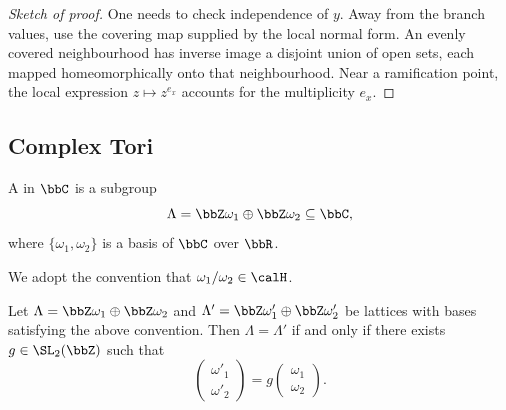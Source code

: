 \begin{proof}[Sketch of proof]
    One needs to check independence of $y$. Away from the branch values, use the covering map supplied by the local normal form. An evenly covered neighbourhood has inverse image a disjoint union of open sets, each mapped homeomorphically onto that neighbourhood. Near a ramification point, the local expression $z \mapsto z^{e_x}$ accounts for the multiplicity $e_x$.
\end{proof}

\subsection{Complex Tori}\label{Sec:MF_complex_tori}
\begin{definition}\label{Def:MF_lattice}
    A  in $\bbC$ is a subgroup
    \[
        \Lambda = \bbZ\omega_1 \oplus \bbZ\omega_2 \subseteq \bbC,
    \]
    where $\{\omega_1, \omega_2\}$ is a basis of $\bbC$ over $\bbR$.
\end{definition}

We adopt the convention that $\omega_1/\omega_2 \in \calH$.

\begin{lemma}\label{Lem:MF_lattice_basis}
    Let $\Lambda = \bbZ\omega_1 \oplus \bbZ\omega_2$ and $\Lambda' = \bbZ\omega'_1 \oplus \bbZ\omega'_2$ be lattices with bases satisfying the above convention. Then $\Lambda = \Lambda'$ if and only if there exists $g \in \SL_2(\bbZ)$ such that
    \[
        \begin{pmatrix}\omega'_1\\ \omega'_2\end{pmatrix} = g\begin{pmatrix}\omega_1\\ \omega_2\end{pmatrix}.
    \]
\end{lemma}


